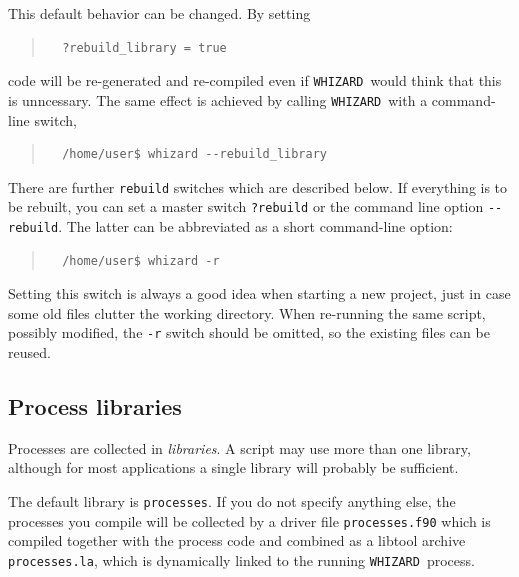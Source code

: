 \documentclass[12pt]{book}
\newcommand{\ttt}[1]{\texttt{#1}}
\newcommand{\whizard}{\texttt{WHIZARD}}
\begin{document}
This default behavior can be changed.  By setting
\begin{quote}
\begin{footnotesize}
\begin{verbatim}
  ?rebuild_library = true
\end{verbatim}
\end{footnotesize}
\end{quote}
code will be re-generated and re-compiled even if \whizard\ would think that
this is unncessary.  The same effect is achieved by calling \whizard\ with a
command-line switch,
\begin{quote}
\begin{footnotesize}
\begin{verbatim}
  /home/user$ whizard --rebuild_library
\end{verbatim}
\end{footnotesize}
\end{quote}
There are further \ttt{rebuild} switches which are described below.  If
everything is to be rebuilt, you can set a master switch \ttt{?rebuild} or the
command line option \verb|--rebuild|.  The latter can be abbreviated as a short
command-line option:
\begin{quote}
\begin{footnotesize}
\begin{verbatim}
  /home/user$ whizard -r
\end{verbatim}
\end{footnotesize}
\end{quote}
Setting this switch is always a good idea when starting a new project, just in
case some old files clutter the working directory.  When re-running the same
script, possibly modified, the \verb|-r| switch should be omitted, so the
existing files can be reused.



\subsection{Process libraries}

Processes are collected in \emph{libraries}.  A script may use more than one
library, although for most applications a single library will probably be
sufficient.

The default library is \ttt{processes}.  If you do not specify anything else,
the processes you compile will be collected by a driver file
\ttt{processes.f90} which is compiled together with the process code and
combined as a libtool archive \ttt{processes.la}, which is dynamically linked
to the running \whizard\ process.
\end{document}
